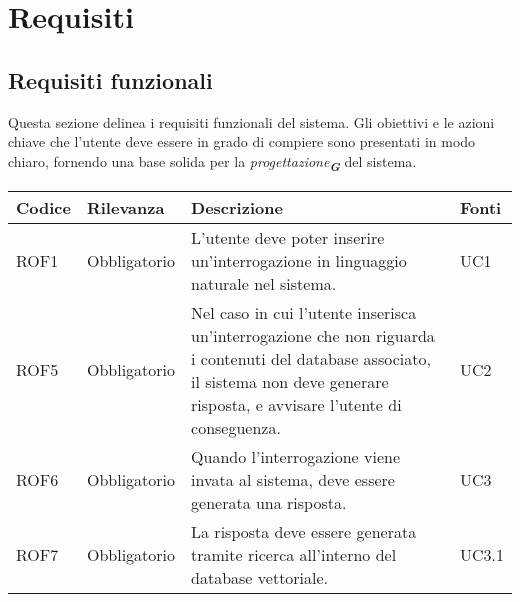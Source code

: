 

\section{Requisiti}
\label{sec:Requisiti}   

\subsection{Requisiti funzionali}
Questa sezione delinea i requisiti funzionali del sistema. Gli obiettivi e le azioni chiave che
l'utente deve essere in grado di compiere sono presentati in modo chiaro, fornendo una base
solida per la \emph{progettazione}\textsubscript{\textit{\textbf{G}}} del sistema.
\begin{table}[h!]
    \centering
    \renewcommand{\arraystretch}{1.6} %
    \begin{tabularx}{\textwidth}{|p{2cm}|p{3cm}|X|p{4cm}|} \hline
    \rowcolor[HTML]{FFD700} 
    \textbf{Codice} & \textbf{Rilevanza} & \textbf{Descrizione} & \textbf{Fonti} \\ \hline
    ROF1 & Obbligatorio & L'utente deve poter inserire un'interrogazione in linguaggio naturale nel sistema. & UC1 \\ \hline
    ROF5 & Obbligatorio & Nel caso in cui l'utente inserisca un'interrogazione che non riguarda i contenuti del database associato, il sistema non deve generare risposta, e avvisare l'utente di conseguenza. & UC2 \\ \hline
    ROF6 & Obbligatorio & Quando l'interrogazione viene invata al sistema, deve essere generata una risposta. & UC3 \\ \hline
    ROF7 & Obbligatorio & La risposta deve essere generata tramite ricerca all'interno del database vettoriale. & UC3.1 \\ \hline

\end{tabularx}
\end{table}

